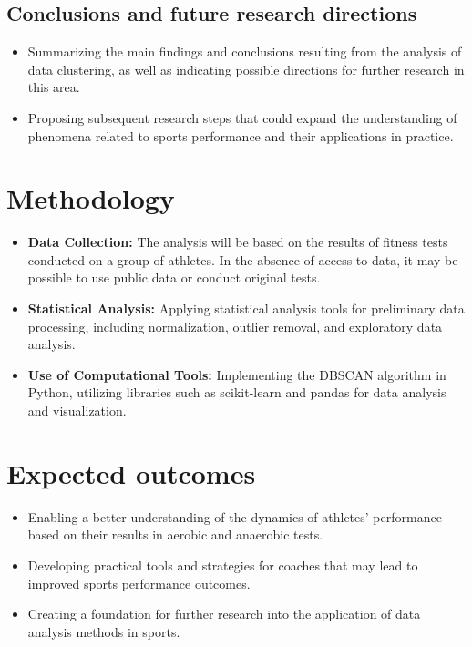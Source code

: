 \documentclass[a4paper,fleqn]{cas-dc}
\begin{document}
\subsection{Conclusions and future research directions}
\begin{itemize}
    \item Summarizing the main findings and conclusions resulting from the analysis of data clustering, as well as indicating possible directions for further research in this area.
    \item Proposing subsequent research steps that could expand the understanding of phenomena related to sports performance and their applications in practice.
\end{itemize}

\section{Methodology}

\begin{itemize}
    \item \textbf{Data Collection:} The analysis will be based on the results of fitness tests conducted on a group of athletes. In the absence of access to data, it may be possible to use public data or conduct original tests.
    \item \textbf{Statistical Analysis:} Applying statistical analysis tools for preliminary data processing, including normalization, outlier removal, and exploratory data analysis.
    \item \textbf{Use of Computational Tools:} Implementing the DBSCAN algorithm in Python, utilizing libraries such as scikit-learn and pandas for data analysis and visualization.
\end{itemize}

\section{Expected outcomes}

\begin{itemize}
    \item Enabling a better understanding of the dynamics of athletes' performance based on their results in aerobic and anaerobic tests.
    \item Developing practical tools and strategies for coaches that may lead to improved sports performance outcomes.
    \item Creating a foundation for further research into the application of data analysis methods in sports.
\end{itemize}
\end{document}

